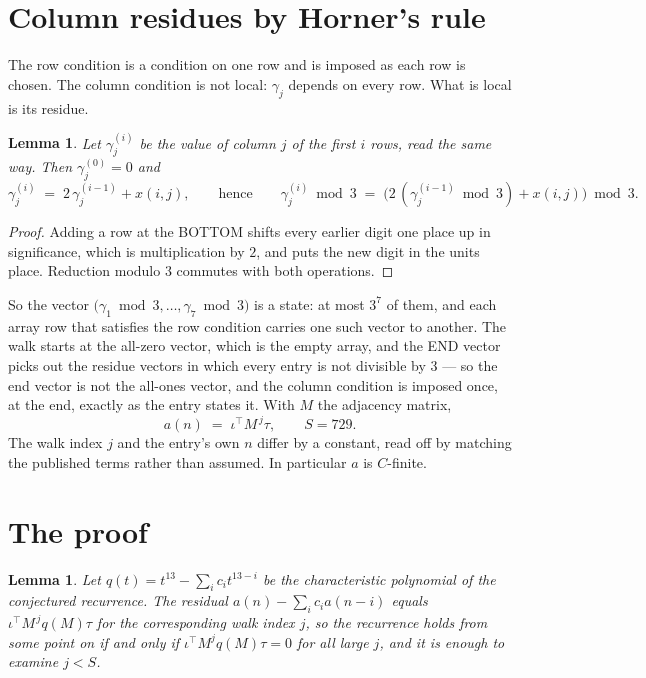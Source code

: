 \documentclass[11pt,a4paper]{article}
\theoremstyle{plain}
\newtheorem{lemma}[theorem]{Lemma}
\theoremstyle{definition}
\begin{document}
\section{Column residues by Horner's rule}

The row condition is a condition on one row and is imposed as each row is chosen. The column
condition is not local: $\gamma_j$ depends on every row. What is local is its residue.

\begin{lemma}\label{lem:horner}
Let $\gamma_j^{(i)}$ be the value of column $j$ of the first $i$ rows, read the same way.
Then $\gamma_j^{(0)}=0$ and
\[
\gamma_j^{(i)}\;=\;2\,\gamma_j^{(i-1)}+x(i,j),
\qquad\text{hence}\qquad
\gamma_j^{(i)}\bmod 3\;=\;
\bigl(2\,(\gamma_j^{(i-1)}\bmod 3)+x(i,j)\bigr)\bmod 3 .
\]
\end{lemma}

\begin{proof}
Adding a row at the BOTTOM shifts every earlier digit one place up in significance, which is
multiplication by $2$, and puts the new digit in the units place. Reduction modulo
$3$ commutes with both operations.
\end{proof}

So the vector $\bigl(\gamma_1\bmod 3,\dots,\gamma_{7}\bmod
3\bigr)$ is a state: at most $3^{7}$ of them, and each array row
that satisfies the row condition carries one such vector to another. The walk starts at the
all-zero vector, which is the empty array, and the END vector picks out the residue vectors in
which every entry is not divisible by $3$ --- so the end vector is not the all-ones
vector, and the column condition is imposed once, at the end, exactly as the entry states it.
With $M$ the adjacency matrix,
\[
a(n)\;=\;\iota^{\!\top}M^{\,j}\tau ,\qquad S=729.
\]
The walk index $j$ and the entry's own $n$ differ by a constant, read off by matching the
published terms rather than assumed. In particular $a$ is $C$-finite.

\section{The proof}

\begin{lemma}\label{lem:crit}
Let $q(t)=t^{13}-\sum_i c_it^{13-i}$ be the characteristic polynomial of the
conjectured recurrence. The residual $a(n)-\sum_ic_ia(n-i)$ equals
$\iota^{\!\top}M^{\,j}q(M)\tau$ for the corresponding walk index $j$, so the recurrence
holds from some point on if and only if $\iota^{\!\top}M^{j}q(M)\tau=0$ for all large $j$,
and it is enough to examine $j<S$.
\end{lemma}
\end{document}
